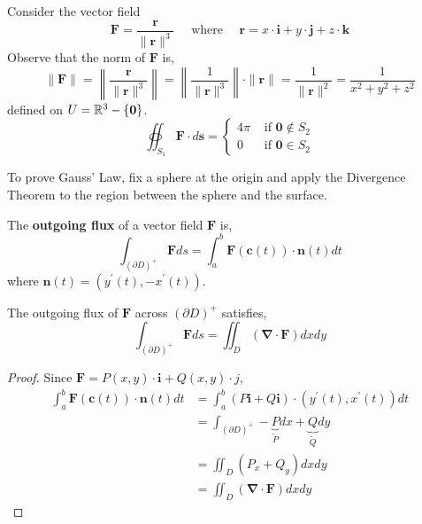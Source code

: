 \begin{thm}
	Consider the vector field
	\[\mathbf{F}=\frac{\mathbf{r}}{\|\mathbf{r}\|^3} \quad \text{ where }\quad \mathbf{r}=x \cdot \mathbf{i}+y \cdot \mathbf{j}+z \cdot \mathbf{k}\]
	Observe that the norm of $\mathbf{F}$ is,
	\[\|\mathbf{F}\|=\left\|\frac{\mathbf{r}}{\|\mathbf{r}\|^3}\right\|=\left\|\frac{1}{\|\mathbf{r}\|^3}\right\| \cdot\|\mathbf{r}\|=\frac{1}{\|\mathbf{r}\|^2}=\frac{1}{x^2+y^2+z^2}\]
	defined on $U = \mathbb{R}^3 - \{\mathbf{0}\}$. 
	\[
	\oiint_{S_1} \mathbf{F} \cdot d \mathbf{s} =
	\begin{cases}
		4 \pi & \text{ if } \mathbf{0} \not\in S_2 \\
		0 & \text{ if } \mathbf{0} \in S_2
	\end{cases}
	\]
\end{thm}

\begin{marginfigure}
	To prove Gauss' Law, fix a sphere at the origin and apply the Divergence Theorem to the region between the sphere and the surface.
\end{marginfigure}

\begin{defn}
	The \textbf{outgoing flux} of a vector field $\mathbf{F}$ is,
	\[\int_{(\partial D)^{+}} \mathbf{F} ds = \int_{a}^{b} \mathbf{F}(\mathbf{c}(t)) \cdot \mathbf{n}(t) dt\]
	where $\mathbf{n}(t) = (y^{\prime}(t), -x^{\prime}(t))$.
\end{defn}

\begin{rmk}
	The outgoing flux of $\mathbf{F}$ across $(\partial D)^+$ satisfies,
	\[\int_{(\partial D)^{+}} \mathbf{F} ds = \iint_D(\mathbf{\nabla} \cdot \mathbf{F}) d x d y\]
\end{rmk}

\begin{proof}
	Since $\mathbf{F} = P(x,y) \cdot \mathbf{i} + Q(x,y) \cdot j$,
	\begin{align*}
		\int_a^b \mathbf{F}(\mathbf{c}(t)) \cdot \mathbf{n}(t) d t&=\int_a^b(P \mathbf{i}+Q \mathbf{i}) \cdot\left(y^{\prime}(t), x^{\prime}(t)\right) d t \\
		&= \int_{(\partial D)^{+}}-\underbrace{P}_{\tilde{P}} d x+ \underbrace{Q}_{\tilde{Q}} d y \\
		&=\iint_D(P_x+Q_y) d x d y \\
		&= \iint_D(\mathbf{\nabla} \cdot \mathbf{F}) d x d y
	\end{align*}
\end{proof}